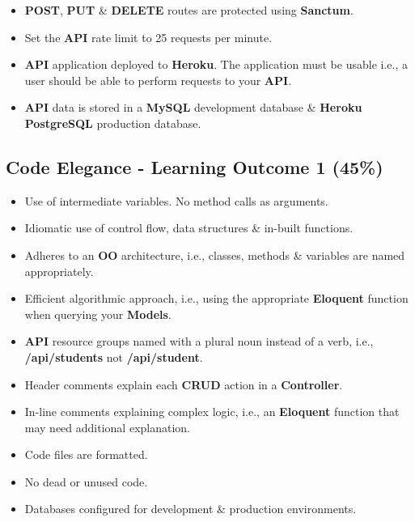 \documentclass{article}
\begin{document}
\begin{itemize}
    \item \textbf{POST}, \textbf{PUT} \& \textbf{DELETE} routes are protected using \textbf{Sanctum}.
    \item Set the \textbf{API} rate limit to 25 requests per minute.
    \item \textbf{API} application deployed to \textbf{Heroku}. The application must be usable i.e., a user should be able to perform requests to your \textbf{API}.
    \item \textbf{API} data is stored in a \textbf{MySQL} development database \& \textbf{Heroku PostgreSQL} production database.   
\end{itemize}

\subsection*{Code Elegance - Learning Outcome 1 (45\%)}
\begin{itemize}
    \item Use of intermediate variables. No method calls as arguments.
    \item Idiomatic use of control flow, data structures \& in-built functions.
    \item Adheres to an \textbf{OO} architecture, i.e., classes, methods \& variables are named appropriately.
    \item Efficient algorithmic approach, i.e., using the appropriate \textbf{Eloquent} function when querying your \textbf{Models}.
    \item \textbf{API} resource groups named with a plural noun instead of a verb, i.e., \textbf{/api/students} not \textbf{/api/student}.
    \item Header comments explain each \textbf{CRUD} action in a \textbf{Controller}.
    \item In-line comments explaining complex logic, i.e., an \textbf{Eloquent} function that may need additional explanation.
    \item Code files are formatted.
    \item No dead or unused code.
    \item Databases configured for development \& production environments.
\end{itemize} 
\end{document}
